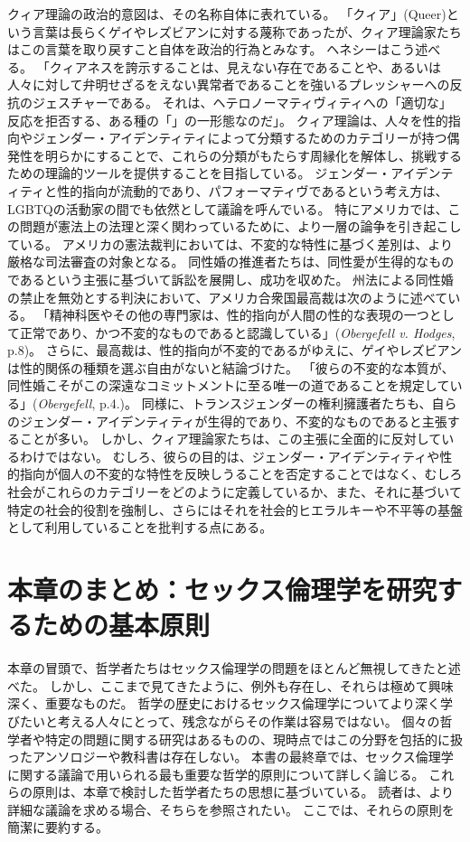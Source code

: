 \documentclass[paper=a4,book,openany]{jlreq} \usepackage{mystyle}
\begin{document}
クィア理論の政治的意図は、その名称自体に表れている。
「クィア」(Queer)という言葉は長らくゲイやレズビアンに対する蔑称であったが、クィア理論家たちはこの言葉を取り戻すこと自体を政治的行為とみなす。
ヘネシーはこう述べる。
「クィアネスを誇示することは、見えない存在であることや、あるいは人々に対して弁明せざるをえない異常者であることを強いるプレッシャーへの反抗のジェスチャーである。
それは、ヘテロノーマティヴィティへの「適切な」反応を拒否する、ある種の「」の一形態なのだ」\citep[p.867]{hennessy93:_queer_theor}。
クィア理論は、人々を性的指向やジェンダー・アイデンティティによって分類するためのカテゴリーが持つ偶発性を明らかにすることで、これらの分類がもたらす周縁化を解体し、挑戦するための理論的ツールを提供することを目指している。
ジェンダー・アイデンティティと性的指向が流動的であり、パフォーマティヴであるという考え方は、LGBTQの活動家の間でも依然として議論を呼んでいる。
特にアメリカでは、この問題が憲法上の法理と深く関わっているために、より一層の論争を引き起こしている。
アメリカの憲法裁判においては、不変的な特性に基づく差別は、より厳格な司法審査の対象となる。
同性婚の推進者たちは、同性愛が生得的なものであるという主張に基づいて訴訟を展開し、成功を収めた。
州法による同性婚の禁止を無効とする判決において、アメリカ合衆国最高裁は次のように述べている。
「精神科医やその他の専門家は、性的指向が人間の性的な表現の一つとして正常であり、かつ不変的なものであると認識している」(\emph{Obergefell v. Hodges}, p.8)。
さらに、最高裁は、性的指向が不変的であるがゆえに、ゲイやレズビアンは性的関係の種類を選ぶ自由がないと結論づけた。
「彼らの不変的な本質が、同性婚こそがこの深遠なコミットメントに至る唯一の道であることを規定している」(\emph{Obergefell}, p.4.)。
同様に、トランスジェンダーの権利擁護者たちも、自らのジェンダー・アイデンティティが生得的であり、不変的なものであると主張することが多い。
しかし、クィア理論家たちは、この主張に全面的に反対しているわけではない。
むしろ、彼らの目的は、ジェンダー・アイデンティティや性的指向が個人の不変的な特性を反映しうることを否定することではなく、むしろ社会がこれらのカテゴリーをどのように定義しているか、また、それに基づいて特定の社会的役割を強制し、さらにはそれを社会的ヒエラルキーや不平等の基盤として利用していることを批判する点にある。

\section{本章のまとめ：セックス倫理学を研究するための基本原則}

本章の冒頭で、哲学者たちはセックス倫理学の問題をほとんど無視してきたと述べた。
しかし、ここまで見てきたように、例外も存在し、それらは極めて興味深く、重要なものだ。
哲学の歴史におけるセックス倫理学についてより深く学びたいと考える人々にとって、残念ながらその作業は容易ではない。
個々の哲学者や特定の問題に関する研究はあるものの、現時点ではこの分野を包括的に扱ったアンソロジーや教科書は存在しない。
本書の最終章では、セックス倫理学に関する議論で用いられる最も重要な哲学的原則について詳しく論じる。
これらの原則は、本章で検討した哲学者たちの思想に基づいている。
読者は、より詳細な議論を求める場合、そちらを参照されたい。
ここでは、それらの原則を簡潔に要約する。
\end{document}
